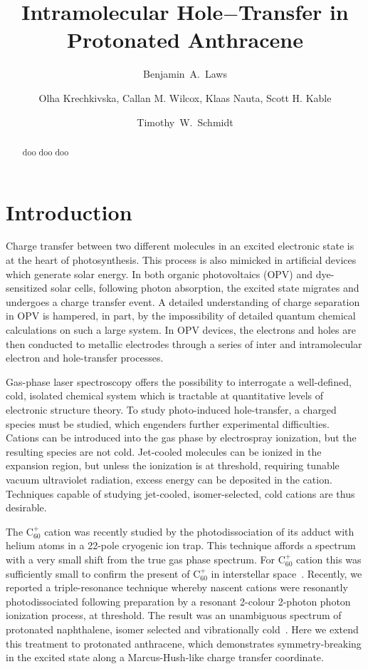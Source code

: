 \documentclass[journal=jpcafh,manuscript=article,layout=onecolumn, 12pt]{achemso}
\author{Benjamin~A.~Laws}
\affiliation{School of Chemistry, University of New South Wales, Sydney NSW 2052, Australia}
\author{Olha Krechkivska, Callan M. Wilcox, Klaas Nauta, Scott H. Kable}
\affiliation{School of Chemistry, University of New South Wales, Sydney NSW 2052, Australia}
\author{Timothy~W.~Schmidt}
\affiliation{School of Chemistry, University of New South Wales, Sydney NSW 2052, Australia}
\title{Intramolecular Hole$-$Transfer in Protonated Anthracene}
\begin{document}
 
\begin{abstract} 
doo doo doo
\end{abstract}
\section{Introduction}
Charge transfer between two different molecules in an excited electronic state is at the heart of photosynthesis. This process is also mimicked in artificial devices which generate solar energy. In both organic photovoltaics (OPV) and dye-sensitized solar cells, following photon absorption, the excited state migrates and undergoes a charge transfer event. A detailed understanding of charge separation in OPV is hampered, in part, by the impossibility of detailed quantum chemical calculations on such a large system. In OPV devices, the electrons and holes are then conducted to metallic electrodes through a series of inter and intramolecular electron and hole-transfer processes.

Gas-phase laser spectroscopy offers the possibility to interrogate a well-defined, cold, isolated chemical system which is tractable at quantitative levels of electronic structure theory. To study photo-induced hole-transfer, a charged species must be studied, which engenders further experimental difficulties. Cations can be introduced into the gas phase by electrospray ionization, but the resulting species are not cold. Jet-cooled molecules can be ionized in the expansion region, but unless the ionization is at threshold, requiring tunable vacuum ultraviolet radiation, excess energy can be deposited in the cation. Techniques capable of studying jet-cooled, isomer-selected, cold cations are thus desirable.

The C$_{60}^+$ cation was recently studied by the photodissociation of its adduct with helium atoms in a 22-pole cryogenic ion trap. This technique affords a spectrum with a very small shift from the true gas phase spectrum. For C$_{60}^+$ cation this was sufficiently small to confirm the present of C$_{60}^+$ in interstellar space~\cite{cam15}. Recently, we reported a triple-resonance technique whereby nascent cations were resonantly photodissociated following preparation by a resonant 2-colour 2-photon photon ionization process, at threshold. The result was an unambiguous spectrum of protonated naphthalene, isomer selected and vibrationally cold~\cite{kre13}. Here we extend this treatment to protonated anthracene, which demonstrates symmetry-breaking in the excited state along a Marcus-Hush-like charge transfer coordinate.
\end{document}
